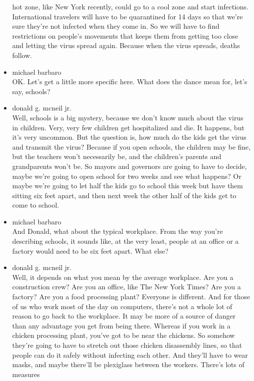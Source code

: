 \begin{itemize}
  hot zone, like New York recently, could go to a cool zone and start
  infections. International travelers will have to be quarantined for 14
  days so that we're sure they're not infected when they come in. So we
  will have to find restrictions on people's movements that keeps them
  from getting too close and letting the virus spread again. Because
  when the virus spreads, deaths follow.
\item
  michael barbaro\\
  OK. Let's get a little more specific here. What does the dance mean
  for, let's say, schools?
\item
  donald g. mcneil jr.\\
  Well, schools is a big mystery, because we don't know much about the
  virus in children. Very, very few children get hospitalized and die.
  It happens, but it's very uncommon. But the question is, how much do
  the kids get the virus and transmit the virus? Because if you open
  schools, the children may be fine, but the teachers won't necessarily
  be, and the children's parents and grandparents won't be. So mayors
  and governors are going to have to decide, maybe we're going to open
  school for two weeks and see what happens? Or maybe we're going to let
  half the kids go to school this week but have them sitting six feet
  apart, and then next week the other half of the kids get to come to
  school.
\item
  michael barbaro\\
  And Donald, what about the typical workplace. From the way you're
  describing schools, it sounds like, at the very least, people at an
  office or a factory would need to be six feet apart. What else?
\item
  donald g. mcneil jr.\\
  Well, it depends on what you mean by the average workplace. Are you a
  construction crew? Are you an office, like The New York Times? Are you
  a factory? Are you a food processing plant? Everyone is different. And
  for those of us who work most of the day on computers, there's not a
  whole lot of reason to go back to the workplace. It may be more of a
  source of danger than any advantage you get from being there. Whereas
  if you work in a chicken processing plant, you've got to be near the
  chickens. So somehow they're going to have to stretch out those
  chicken disassembly lines, so that people can do it safely without
  infecting each other. And they'll have to wear masks, and maybe
  there'll be plexiglass between the workers. There's lots of measures

\end{itemize}

